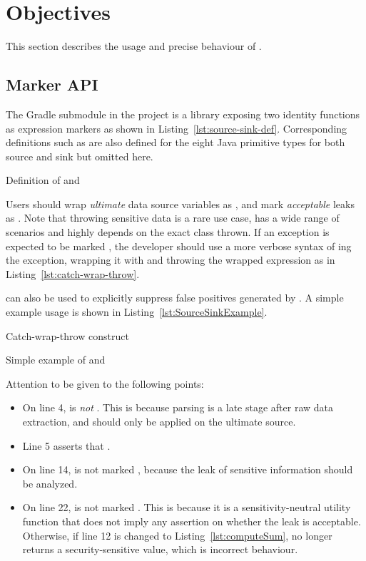 \section{Objectives}\label{sec:objectives}
This section describes the usage and precise behaviour of \pname{}.

\subsection{Marker API}\label{subsec:marker-api}
The  Gradle submodule in the project
is a library exposing two identity functions as expression markers
as shown in Listing~\ref{lst:source-sink-def}.
Corresponding definitions such as 
are also defined for the eight Java primitive types
for both source and sink but omitted here.

{Definition of  and }

Users should wrap \emph{ultimate} data source variables as ,
and mark \emph{acceptable} leaks as .
Note that throwing sensitive data is a rare use case,
has a wide range of scenarios
and highly depends on the exact class thrown.
If an exception is expected to be marked ,
the developer should use a more verbose syntax of ing the exception,
wrapping it with  and throwing the wrapped expression as in Listing~\ref{lst:catch-wrap-throw}.

 can also be used to explicitly suppress false positives generated by \pname{}.
A simple example usage is shown in Listing~\ref{lst:SourceSinkExample}.

{Catch-wrap-throw construct}


{Simple example of  and }

Attention to be given to the following points:
\begin{itemize}
	\item On line 4,  is \emph{not} .
		This is because parsing is a late stage after raw data extraction,
		and  should only be applied on the ultimate source.
	\item Line 5 asserts that .
	\item On line 14,  is not marked ,
		because the leak of sensitive information should be analyzed.
	\item On line 22,  is not marked .
		This is because it is a sensitivity-neutral utility function
		that does not imply any assertion on whether the leak is acceptable.
		Otherwise, if line 12 is changed to Listing~\ref{lst:computeSum},
		 no longer returns a security-sensitive value,
		which is incorrect behaviour.
\end{itemize}

